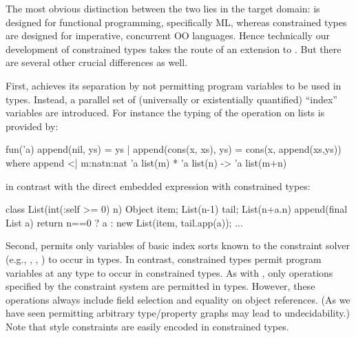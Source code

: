 The most obvious distinction between the two lies in the target
domain: \DML{} is designed for functional programming, specifically
ML, whereas constrained types are designed for imperative, concurrent
OO languages. Hence technically our development of constrained types
takes the route of an extension to \FJ. But there are several other
crucial differences as well.

  {\lstset{language=ML,basicstyle=\tt,tabsize=4,columns=fullflexible,captionpos=b,xleftmargin=1em,xrightmargin=1em,keywordstyle=,keepspaces}}
  {}

First, \DML{} achieves its separation by not permitting program
variables to be used in types. Instead, a parallel set of (universally
or existentially quantified) ``index'' variables are
introduced. For instance the typing of the  operation on
lists is provided by:
\begin{displayml}
fun('a)
  append(nil, ys) = ys
| append(cons(x, xs), ys)
    = cons(x, append(xs,ys))
where append <| {m:nat}{n:nat} 
    'a list(m) * 'a list(n) -> 'a list(m+n)  
\end{displayml}
\noindent in contrast with the direct embedded expression with constrained types:
\begin{xten}
class List(int(:self >= 0) n) {
  Object item;
  List(n-1) tail;
  List(n+a.n) append(final List a) { 
    return n==0
      ? a : new List(item, tail.app(a));
  }
  ...
}
\end{xten}

Second, \DML{} permits only variables of basic index sorts known to
the constraint solver (e.g., , , ) to
occur in types. In contrast, constrained types permit program
variables at any type to occur in constrained types. As with \DML,
only operations specified by the constraint system are permitted in
types. However, these operations always include field selection and
equality on object references.  (As we have seen permitting arbitrary
type/property graphs may lead to undecidability.) Note that \DML{}
style constraints are easily encoded in constrained types.


